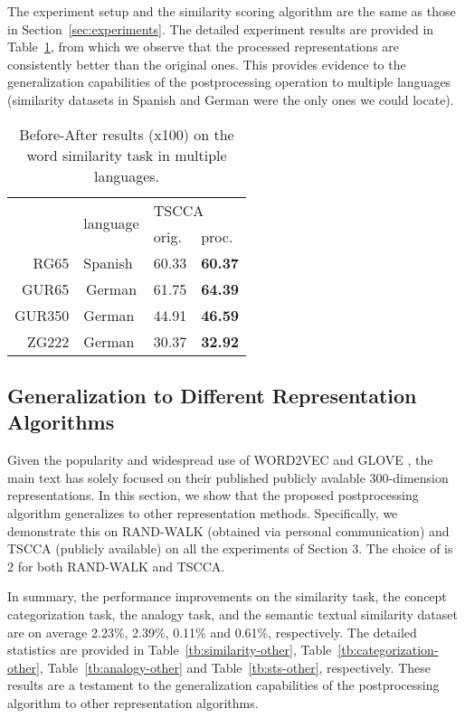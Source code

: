\documentclass{article} \usepackage{acl2017,times}
\begin{document}
The experiment setup and the similarity scoring algorithm are the same as those in Section~\ref{sec:experiments}. The detailed experiment results are provided in Table~\ref{tb:similarity-multilingual}, from which we observe that the processed representations are consistently better than the original ones. This provides evidence to the generalization capabilities of the  postprocessing operation  to  multiple languages (similarity datasets in Spanish and German were the only ones we could locate).  

\begin{table}[!h]
\centering
\begin{tabular}{|r|l|l|l|}
\hline
\multirow{2}{*}{} & \multirow{2}{*}{language}   & \multicolumn{2}{l|}{TSCCA} \\ \cline{3-4} 
                  &                             & orig.        & proc.       \\ \hline
RG65              & Spanish                     & 60.33             &    \bf 60.37         \\ \hline
GUR65             & \multicolumn{1}{c|}{German} & 61.75             &    \bf 64.39         \\ \hline
GUR350            & German                      & 44.91             &    \bf 46.59         \\ \hline
ZG222             & German                      & 30.37             &    \bf 32.92         \\ \hline
\end{tabular}
\caption{Before-After results (x100) on the word similarity task in multiple languages.}
\label{tb:similarity-multilingual}
\end{table}

\subsection{Generalization to Different Representation Algorithms}
Given the popularity and widespread use of WORD2VEC \citep{mikolov2013efficient} and GLOVE \citep{pennington2014glove}, the main text has solely focused on their published publicly avalable 300-dimension representations. In this section, we show that the proposed postprocessing algorithm generalizes to other representation methods. Specifically, we demonstrate this on RAND-WALK (obtained via personal communication) and TSCCA (publicly available) on all the experiments of  Section 3. The choice of  is 2 for both RAND-WALK and  TSCCA.

In summary, the performance improvements on the similarity task, the concept categorization task, the analogy task, and the semantic textual similarity dataset are on average 2.23\%, 2.39\%, 0.11\% and 0.61\%, respectively. The detailed statistics are provided in Table~\ref{tb:similarity-other}, Table~\ref{tb:categorization-other}, Table~\ref{tb:analogy-other} and Table~\ref{tb:sts-other}, respectively. These  results are a testament to the generalization capabilities of the postprocessing algorithm to other representation algorithms.  
\end{document}
